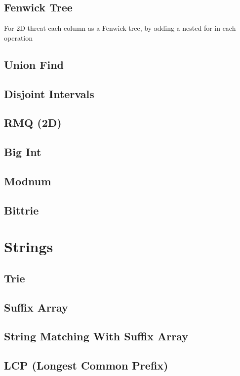 \documentclass[10pt,landscape,twocolumn,a4paper,notitlepage]{article}
\newcommand\cppfile[2][]{

}
\begin{document}
\subsection{Fenwick Tree}
For 2D threat each column as a Fenwick tree, by adding a nested for in each operation
\cppfile{estructuras/fenwick}
\subsection{Union Find}
\cppfile{estructuras/union.find}
\subsection{Disjoint Intervals}
\cppfile{estructuras/disjoint.intervals}
\subsection{RMQ (2D)}
\cppfile{estructuras/rmq.2d}
\subsection{Big Int}
\cppfile{estructuras/bigint}
\subsection{Modnum}
\cppfile{estructuras/mnum}
\subsection{Bittrie}
\cppfile{estructuras/bitrie}

\section{Strings}
\subsection{Trie}
\cppfile{string/trie}
\subsection{Suffix Array}
\cppfile[-34]{string/suffix.array}
\subsection{String Matching With Suffix Array}
\cppfile[37-58]{string/suffix.array}
\subsection{LCP (Longest Common Prefix)}
\cppfile[60-75]{string/suffix.array}
\end{document}
